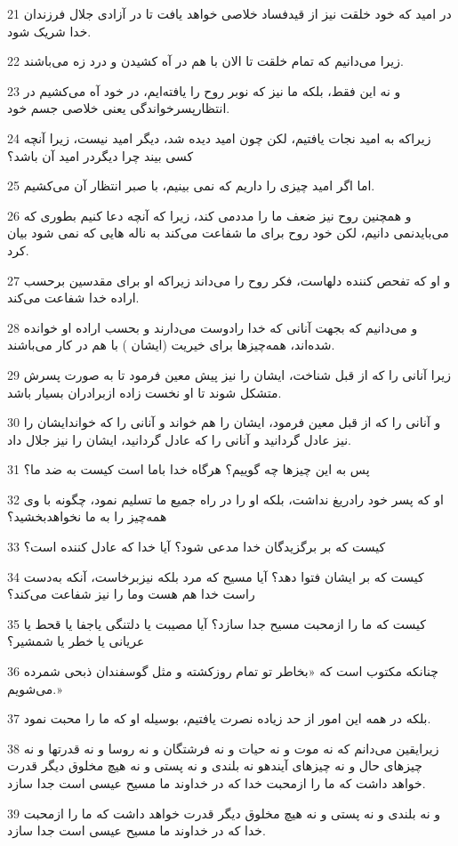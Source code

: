 \par 21 در امید که خود خلقت نیز از قیدفساد خلاصی خواهد یافت تا در آزادی جلال فرزندان خدا شریک شود.
\par 22 زیرا می‌دانیم که تمام خلقت تا الان با هم در آه کشیدن و درد زه می‌باشند.
\par 23 و نه این فقط، بلکه ما نیز که نوبر روح را یافته‌ایم، در خود آه می‌کشیم در انتظارپسرخواندگی یعنی خلاصی جسم خود.
\par 24 زیراکه به امید نجات یافتیم، لکن چون امید دیده شد، دیگر امید نیست، زیرا آنچه کسی بیند چرا دیگردر امید آن باشد؟
\par 25 اما اگر امید چیزی را داریم که نمی بینیم، با صبر انتظار آن می‌کشیم.
\par 26 و همچنین روح نیز ضعف ما را مددمی کند، زیرا که آنچه دعا کنیم بطوری که می‌بایدنمی دانیم، لکن خود روح برای ما شفاعت می‌کند به ناله هایی که نمی شود بیان کرد.
\par 27 و او که تفحص کننده دلهاست، فکر روح را می‌داند زیراکه او برای مقدسین برحسب اراده خدا شفاعت می‌کند.
\par 28 و می‌دانیم که بجهت آنانی که خدا رادوست می‌دارند و بحسب اراده او خوانده شده‌اند، همه‌چیزها برای خیریت (ایشان ) با هم در کار می‌باشند.
\par 29 زیرا آنانی را که از قبل شناخت، ایشان را نیز پیش معین فرمود تا به صورت پسرش متشکل شوند تا او نخست زاده ازبرادران بسیار باشد.
\par 30 و آنانی را که از قبل معین فرمود، ایشان را هم خواند و آنانی را که خواندایشان را نیز عادل گردانید و آنانی را که عادل گردانید، ایشان را نیز جلال داد.
\par 31 پس به این چیزها چه گوییم؟ هرگاه خدا باما است کیست به ضد ما؟
\par 32 او که پسر خود رادریغ نداشت، بلکه او را در راه جمیع ما تسلیم نمود، چگونه با وی همه‌چیز را به ما نخواهدبخشید؟
\par 33 کیست که بر برگزیدگان خدا مدعی شود؟ آیا خدا که عادل کننده است؟
\par 34 کیست که بر ایشان فتوا دهد؟ آیا مسیح که مرد بلکه نیزبرخاست، آنکه به‌دست راست خدا هم هست وما را نیز شفاعت می‌کند؟
\par 35 کیست که ما را ازمحبت مسیح جدا سازد؟ آیا مصیبت یا دلتنگی یاجفا یا قحط یا عریانی یا خطر یا شمشیر؟
\par 36 چنانکه مکتوب است که «بخاطر تو تمام روزکشته و مثل گوسفندان ذبحی شمرده می‌شویم.»
\par 37 بلکه در همه این امور از حد زیاده نصرت یافتیم، بوسیله او که ما را محبت نمود.
\par 38 زیرایقین می‌دانم که نه موت و نه حیات و نه فرشتگان و نه روسا و نه قدرتها و نه چیزهای حال و نه چیزهای آیندهو نه بلندی و نه پستی و نه هیچ مخلوق دیگر قدرت خواهد داشت که ما را ازمحبت خدا که در خداوند ما مسیح عیسی است جدا سازد.
\par 39 و نه بلندی و نه پستی و نه هیچ مخلوق دیگر قدرت خواهد داشت که ما را ازمحبت خدا که در خداوند ما مسیح عیسی است جدا سازد.


